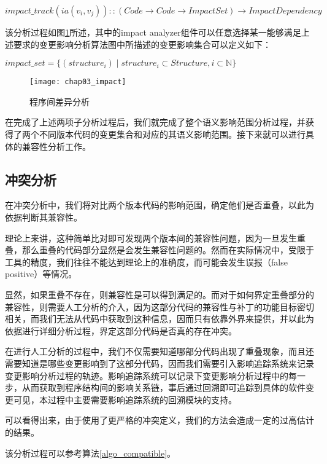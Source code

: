 \begin{definition}
	$impact\_track(ia(v_i,v_j))::(Code \rightarrow Code \rightarrow Impact Set) \rightarrow Impact Dependency$
\end{definition}


该分析过程如图\ref {impact_analyzer}所述，其中的impact analyzer组件可以任意选择某一能够满足上述要求的变更影响分析算法图中所描述的变更影响集合可以定义如下：
\begin{definition}
	$impact\_set = \{ (structure_i) \mid  structure_i \subset Structure, i \subset \mathbb{N}\}$
\end{definition}

\begin{figure}[H]
	\centering
	\texttt{[image: chap03\_impact]}
	\caption {程序间差异分析}
	\label {impact_analyzer}	
\end{figure}

在完成了上述两项子分析过程后，我们就完成了整个语义影响范围分析过程，并获得了两个不同版本代码的变更集合和对应的其语义影响范围。接下来就可以进行具体的兼容性分析工作。

\subsection{冲突分析}

在冲突分析中，我们将对比两个版本代码的影响范围，确定他们是否重叠，以此为依据判断其兼容性。

理论上来讲，这种简单比对即可发现两个版本间的兼容性问题，因为一旦发生重叠，那么重叠的代码部分显然是会发生兼容性问题的。然而在实际情况中，受限于工具的精度，我们往往不能达到理论上的准确度，而可能会发生误报（false positive）等情况。

显然，如果重叠不存在，则兼容性是可以得到满足的。而对于如何界定重叠部分的兼容性，则需要人工分析的介入，因为这部分代码的兼容性与补丁的功能目标密切相关，而我们无法从代码中获取到这种信息，因而只有依靠外界来提供，并以此为依据进行详细分析过程，界定这部分代码是否真的存在冲突。

在进行人工分析的过程中，我们不仅需要知道哪部分代码出现了重叠现象，而且还需要知道是哪些变更影响到了这部分代码，因而我们需要引入影响追踪系统来记录变更影响分析过程的轨迹。影响追踪系统可以记录下变更影响分析过程中的每一步，从而获取到程序结构间的影响关系链，事后通过回溯即可追踪到具体的软件变更可见，本过程中主要需要影响追踪系统的回溯模块的支持。

可以看得出来，由于使用了更严格的冲突定义，我们的方法会造成一定的过高估计的结果。

该分析过程可以参考算法\ref {algo_compatible}。

